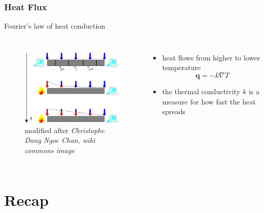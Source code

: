 \documentclass[hide notes,intlimits]{beamer}
\begin{document}
\begin{frame}
  \frametitle{Heat Flux}
 \begin{block}{Fourier's law of heat conduction}
  \begin{columns}
    \column[c]{5.5cm}
  \begin{figure}
    \includegraphics[width=5cm]{figures/heatconduction}%
   \\[.25em] \tiny{modified after \emph{Christophe Dang Ngoc Chan, wiki commons image}}
  \end{figure} 
    \column[c]{6.5cm}
  \begin{itemize}
  \item heat flows from \alert{higher} to \alert{lower} temperature
 \begin{equation*}
    \mathbf{q} = -k \nabla T
  \end{equation*}
  \item the thermal conductivity $k$ is a measure for how fast the heat spreads
 \end{itemize}
  \end{columns}
\end{block}
\end{frame}


\section{Recap}
\end{document}
